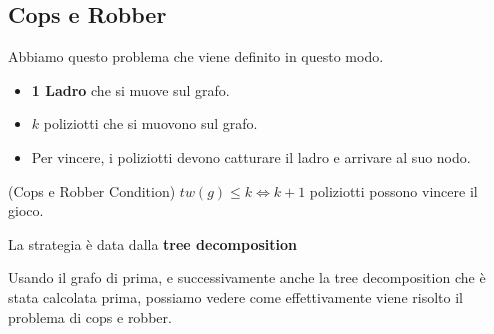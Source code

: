 \subsection{Cops e Robber}
Abbiamo questo problema che viene definito in questo modo.

\begin{itemize}
    \item \textbf{1 Ladro} che si muove sul grafo.
    \item $k$ poliziotti che si muovono sul grafo.
    \item Per vincere, i poliziotti devono catturare il ladro e arrivare al suo nodo.
\end{itemize}

\begin{theorem}(Cops e Robber Condition)
    $tw(g) \leq k \iff k+1$ poliziotti possono vincere il gioco.

    La strategia è data dalla \textbf{tree decomposition}
\end{theorem}

Usando il grafo di prima, e successivamente anche la tree decomposition che è
stata calcolata prima, possiamo vedere come effettivamente viene risolto il
problema di cops e robber.

